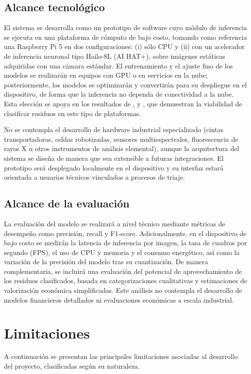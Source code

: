\subsection{Alcance tecnológico}
El sistema se desarrolla como un prototipo de software cuyo módulo de inferencia se ejecuta en una plataforma de cómputo de bajo costo, tomando como referencia una Raspberry Pi 5 en dos configuraciones: (i) sólo CPU y (ii) con un acelerador de inferencia neuronal tipo Hailo-8L (AI HAT+), sobre imágenes estáticas adquiridas con una cámara estándar. El entrenamiento y el ajuste fino de los modelos se realizarán en equipos con GPU o en servicios en la nube; posteriormente, los modelos se optimizarán y convertirán para su despliegue en el dispositivo, de forma que la inferencia no dependa de conectividad a la nube. Esta elección se apoya en los resultados de \cite{castrobelloConvolutionalNeuralNetwork2025}, \cite{daoDesignImplementationRealTime2026} y \cite{mutarAIBasedModelHome2026}, que demuestran la viabilidad de clasificar residuos en este tipo de plataformas.

No se contempla el desarrollo de hardware industrial especializado (cintas transportadoras, celdas robotizadas, sensores multiespectrales, fluorescencia de rayos X u otros instrumentos de análisis elemental), aunque la arquitectura del sistema se diseña de manera que sea extensible a futuras integraciones. El prototipo será desplegado localmente en el dispositivo y su interfaz estará orientada a usuarios técnicos vinculados a procesos de triaje.

\subsection{Alcance de la evaluación}
La evaluación del modelo se realizará a nivel técnico mediante métricas de desempeño como precisión, recall y F1-score. Adicionalmente, en el dispositivo de bajo costo se medirán la latencia de inferencia por imagen, la tasa de cuadros por segundo (FPS), el uso de CPU y memoria y el consumo energético, así como la variación de la precisión del modelo tras su cuantización. De manera complementaria, se incluirá una evaluación del potencial de aprovechamiento de los residuos clasificados, basada en categorizaciones cualitativas y estimaciones de valorización económica simplificadas. Este análisis no contempla el desarrollo de modelos financieros detallados ni evaluaciones económicas a escala industrial.

\section{Limitaciones}
A continuación se presentan las principales limitaciones asociadas al desarrollo del proyecto, clasificadas según su naturaleza.

